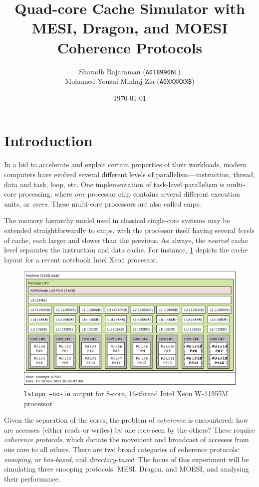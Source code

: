 \documentclass[date,tikzlibs,lmodern,10pt]{epreport}
\title{Quad-core Cache Simulator with MESI, Dragon, and MOESI Coherence Protocols}
\author{Sharadh Rajaraman (\texttt{A0189906L}) \\ Mohamed Yousuf Minhaj Zia (\texttt{A0XXXXXXB})}
\date{\today}
\begin{document}
\maketitle

\tableofcontents

\section{Introduction}
In a bid to accelerate and exploit certain properties of their workloads, modern computers have evolved several different levels of parallelism---instruction, thread, data and task, loop, etc.
One implementation of task-level parallelism is multi-core processing, where \emph{one} processor chip contains several different execution units, or \emph{cores}.
These multi-core processors are also called \glspl{cmp}.

The memory hierarchy model used in classical single-core systems may be extended straightforwardly to \glspl{cmp}, with the processor itself having several \emph{levels} of cache, each larger and slower than the previous.
As always, the \emph{nearest} cache level separates the instruction and data cache.
For instance, \cref{fig:xeon-lstopo} depicts the cache layout for a recent notebook Intel Xeon processor.

\begin{figure}[htbp]
	\centering
	\includegraphics[width=0.8\columnwidth]{images/lstopo.pdf}
	\caption{\texttt{lstopo --no-io} output for 8-core, 16-thread Intel\textsuperscript\textregistered{} Xeon\textsuperscript\textregistered{} W-11955M processor}\label{fig:xeon-lstopo}
\end{figure}

Given the separation of the cores, the problem of \emph{coherence} is encountered: how are accesses (either reads or writes) by one core seen by the others?
These require \emph{coherence protocols}, which dictate the movement and broadcast of accesses from one core to all others.
There are two broad categories of coherence protocols: \emph{snooping}, or \emph{bus-based}, and \emph{directory-based}.
The focus of this experiment will be simulating three snooping protocols: MESI, Dragon, and MOESI, and analysing their performance.
\end{document}
